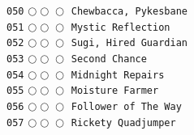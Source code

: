 \documentclass[a4paper,landscape]{article}
\begin{document}
\begin{multicols*}{5}
\texttt{050} \(\bigcirc\!\bigcirc\!\bigcirc\)  \texttt{Chewbacca, Pykesbane} \vspace{-0.3mm}\\ 
\texttt{051} \(\bigcirc\!\bigcirc\!\bigcirc\)  \texttt{Mystic Reflection} \vspace{-0.3mm}\\ 
\texttt{052} \(\bigcirc\!\bigcirc\!\bigcirc\)  \texttt{Sugi, Hired Guardian} \vspace{-0.3mm}\\ 
\texttt{053} \(\bigcirc\!\bigcirc\!\bigcirc\)  \texttt{Second Chance} \vspace{-0.3mm}\\ 
\texttt{054} \(\bigcirc\!\bigcirc\!\bigcirc\)  \texttt{Midnight Repairs} \vspace{-0.3mm}\\ 
\texttt{055} \(\bigcirc\!\bigcirc\!\bigcirc\)  \texttt{Moisture Farmer} \vspace{-0.3mm}\\ 
\texttt{056} \(\bigcirc\!\bigcirc\!\bigcirc\)  \texttt{Follower of The Way} \vspace{-0.3mm}\\ 
\texttt{057} \(\bigcirc\!\bigcirc\!\bigcirc\)  \texttt{Rickety Quadjumper} \vspace{-0.3mm}\\ 

\end{multicols*}
\end{document}
